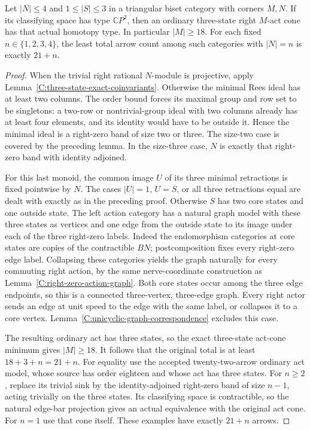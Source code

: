 \begin{theorem}
\label{C:small-opposite-corner-three-states}
Let $|N|\leq4$ and $1\leq|S|\leq3$ in a triangular biset
category with corners $M,N$. If its classifying space has type
$\mathbb CP^2$, then an ordinary three-state right $M$-act cone
has that actual homotopy type. In particular $|M|\geq18$.
For each fixed $n\in\{1,2,3,4\}$, the least total arrow count
among such categories with $|N|=n$ is exactly $21+n$.
\end{theorem}
\begin{proof}
When the trivial right rational $N$-module is projective, apply
Lemma~\ref{C:three-state-exact-coinvariants}.
Otherwise the minimal Rees ideal has at least two columns.
The order bound forces its maximal group and row set to be
singletons: a two-row or nontrivial-group ideal with two
columns already has at least four elements, and its identity
would have to be outside it. Hence the minimal ideal is a
right-zero band of size two or three.
The size-two case is covered by the preceding lemma.
In the size-three case, $N$ is exactly that right-zero band
with identity adjoined.

For this last monoid, the common image $U$ of its three
minimal retractions is fixed pointwise by $N$.
The cases $|U|=1$, $U=S$, or all three retractions equal
are dealt with exactly as in the preceding proof.
Otherwise $S$ has two core states and one outside state.
The left action category has a natural graph model with
these three states as vertices and one edge from the outside
state to its image under each of the three right-zero labels.
Indeed the endomorphism categories at core states are copies
of the contractible $BN$; postcomposition fixes every
right-zero edge label. Collapsing these categories yields
the graph naturally for every commuting right action, by
the same nerve-coordinate construction as
Lemma~\ref{C:right-zero-action-graph}.
Both core states occur among the three edge endpoints, so
this is a connected three-vertex, three-edge graph.
Every right actor sends an edge at unit speed to the edge
with the same label, or collapses it to a core vertex.
Lemma~\ref{C:unicyclic-graph-correspondence} excludes this case.

The resulting ordinary act has three states, so the exact
three-state act-cone minimum gives $|M|\geq18$.
It follows that the original total is at least $18+3+n=21+n$.
For equality use the accepted twenty-two-arrow ordinary act
model, whose source has order eighteen and whose act has three
states. For $n\geq2$, replace its trivial sink by the
identity-adjoined right-zero band of size $n-1$, acting
trivially on the three states. Its classifying space is
contractible, so the natural edge-bar projection gives an
actual equivalence with the original act cone. For $n=1$
use that cone itself. These examples have exactly $21+n$
arrows.
\end{proof}

